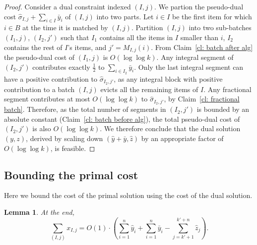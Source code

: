 \documentclass[12pt]{article}
\newtheorem{lemma}[theorem]{Lemma}
\begin{document}
\begin{proof}
Consider a dual constraint indexed $(I,j)$. 
We partion the pseudo-dual cost 
$\hat{\sigma}_{I,j} + \sum_{i\in I} \bar{y}_i$
of $(I,j)$
into two parts. Let $i\in I$ be the first item for which $i\in B$ at the
time it is matched by $(I,j)$. Partition $(I,j)$ into two 
sub-batches $(I_1,j)$, $(I_2,j')$ 
such that $I_1$ contains 
all the items in $I$ smaller than $i$, $I_2$ contains 
the rest of $I$'s items, and $j'=M_{I,j}(i)$.
From Claim~\ref{cl: batch after alg} the pseudo-dual cost of 
$(I_1,j)$ is $O(\log\log k)$. Any integral segment 
of $(I_2,j')$ contributes 
exactly $\frac 1 2$ to $\sum_{i\in I_2} \bar{y}_i$. Only 
the last integral segment can have a positive contribution 
to $\hat{\sigma}_{I_2,j'}$, as any integral block with positive 
contribution to a batch $(I,j)$ evicts all the remaining 
items of $I$. Any fractional segment contributes at most 
$O(\log \log k)$ to $\hat{\sigma}_{I_2,j'}$, by 
Claim~\ref{cl: fractional batch}. Therefore, as the total
number of segments in $(I_2,j')$ is bounded by an
absolute constant
(Claim~\ref{cl: batch before alg}), the total pseudo-dual 
cost of $(I_2,j')$ is also $O(\log \log k)$.
We therefore conclude that the dual solution $(y,z)$,
derived by scaling down $(\hat{y}+\bar{y},\hat{z})$ 
by an appropriate factor of $O(\log \log k)$, is feasible.
\end{proof}


\subsection{Bounding the primal cost}

Here we bound the cost of the primal solution using the
cost of the dual solution.
\begin{lemma}\label{lm: primal cost}
At the end, 
$$
\sum_{(I,j)} x_{I,j} = O(1)\cdot
\left(\sum_{i=1}^{n} \hat{y}_i + \sum_{i=1}^{n} \bar{y}_i - 
\sum_{j=k'+1}^{k'+n} \hat{z}_j\right).
$$
\end{lemma}
\end{document}

